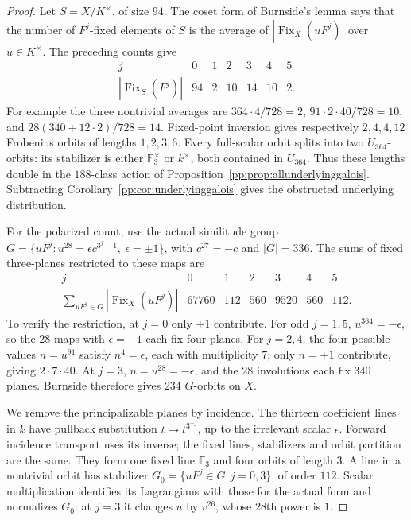 \begin{proof}
Let $S=X/K^\times$, of size $94$. The coset form of Burnside's
lemma says that the number of $F^j$-fixed elements of $S$ is the
average of $|\operatorname{Fix}_X(uF^j)|$ over $u\in K^\times$.
The preceding counts give
\[
\begin{array}{c|rrrrrr}
j&0&1&2&3&4&5\\\hline
|\operatorname{Fix}_S(F^j)|&94&2&10&14&10&2.
\end{array}
\]
For example the three nontrivial averages are
$364\cdot4/728=2$, $91\cdot2\cdot40/728=10$, and
$28(340+12\cdot2)/728=14$.
Fixed-point inversion gives respectively $2,4,4,12$ Frobenius
orbits of lengths $1,2,3,6$. Every full-scalar orbit splits into two
$U_{364}$-orbits: its stabilizer is either $\mathbb F_3^\times$ or
$k^\times$, both contained in $U_{364}$. Thus these lengths double
in the $188$-class action of
Proposition~\ref{pp:prop:allunderlyinggalois}. Subtracting
Corollary~\ref{pp:cor:underlyinggalois} gives the obstructed
underlying distribution.

For the polarized count, use the actual similitude group
$G=\{uF^j:u^{28}=\epsilon c^{3^j-1},\ \epsilon=\pm1\}$,
with $c^{27}=-c$ and $|G|=336$.
The sums of fixed three-planes restricted to these maps are
\[
\begin{array}{c|rrrrrr}
j&0&1&2&3&4&5\\\hline
\displaystyle\sum_{uF^j\in G}|\operatorname{Fix}_X(uF^j)|
&67760&112&560&9520&560&112.
\end{array}
\]
To verify the restriction, at $j=0$ only $\pm1$ contribute.
For odd $j=1,5$, $u^{364}=-\epsilon$, so the $28$ maps with
$\epsilon=-1$ each fix four planes. For $j=2,4$, the four possible
values $n=u^{91}$ satisfy $n^4=\epsilon$, each with multiplicity
$7$; only $n=\pm1$ contribute, giving $2\cdot7\cdot40$.
At $j=3$, $n=u^{28}=-\epsilon$, and the $28$ involutions each
fix $340$ planes. Burnside therefore gives $234$ $G$-orbits on $X$.

We remove the principalizable planes by incidence. The thirteen
coefficient lines in $k$ have pullback substitution
$t\mapsto t^{3^{-j}}$, up to the irrelevant scalar $\epsilon$.
Forward incidence transport uses its inverse; the fixed lines,
stabilizers and orbit partition are the same.
They form one fixed line $\mathbb F_3$ and four orbits of length
$3$. A line in a nontrivial orbit has stabilizer
$G_0=\{uF^j\in G:j=0,3\}$, of order $112$.
Scalar multiplication identifies its Lagrangians with those for
the actual form and normalizes $G_0$: at $j=3$ it changes $u$ by
$v^{26}$, whose $28$th power is $1$.


\end{proof}
